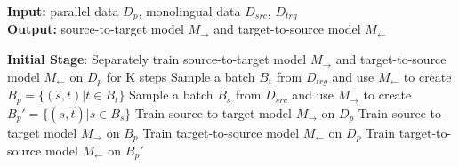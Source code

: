 \documentclass[letterpaper]{article} %
\begin{document}
\begin{algorithm}[h]
\small
	\caption{Iterative Back-Translation}
	\textbf{Input:} parallel data $D_p$, monolingual data $D_{src}$, $D_{trg}$ \\
	\textbf{Output:} source-to-target model $M_{\rightarrow}$ and target-to-source model $M_{\leftarrow}$
	\begin{algorithmic}[1]
		\State \textbf{Initial Stage}: Separately train source-to-target model $M_{\rightarrow}$ and target-to-source model $M_{\leftarrow}$ on $D_{p}$ for K steps
		    \State Sample a batch $B_{t}$ from $D_{trg}$ and use  $M_{\leftarrow}$ to create $B_p=\{(\hat{s}, t) | t\in B_t\}$
		    \State Sample a batch $B_{s}$ from $D_{src}$ and use  $M_{\rightarrow}$ to create $B_p'=\{(s, \hat{t}) | s\in B_s\}$
		    \State Train source-to-target model $M_{\rightarrow}$ on $D_{p}$
		    \State Train source-to-target model $M_{\rightarrow}$ on $B_p$
		    \State Train target-to-source model $M_{\leftarrow}$ on $D_{p}$
		    \State Train target-to-source model $M_{\leftarrow}$ on $B_{p}'$
	    \EndWhile
	\end{algorithmic}
\label{alg:ibt}
\end{algorithm}
\end{document}
